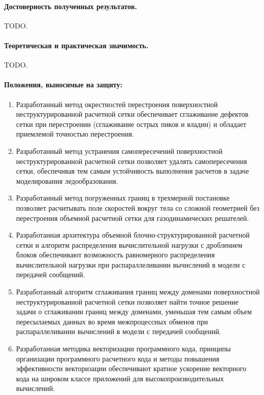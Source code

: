 \documentclass[a4paper,14pt]{extarticle}                     %
\theoremstyle{plain}                                         %
\begin{document}
\paragraph{Достоверность полученных результатов.} TODO.

\paragraph{Теоретическая и практическая значимость.} TODO.

\paragraph{Положения, выносимые на защиту:}
\begin{enumerate}
\item Разработанный метод окрестностей перестроения поверхностной неструктурированной расчетной сетки обеспечивает сглаживание дефектов сетки при перестроении (сглаживание острых пиков и владин) и обладает приемлемой точностью перестроения.
\item Разработанный метод устранения самопересечений поверхностной неструктурированной расчетной сетки позволяет удалять самопересечения сетки, обеспечивая тем самым устойчивость выполнения расчетов в задаче моделирования ледообразования.
\item Разработанный метод погруженных границ в трехмерной постановке позволяет расчитывать поле скоростей вокруг тела со сложной геометрией без перестроения объемной расчетной сетки для газодинамических решателей.
\item Разработанная архитектура объемной блочно-структурированной расчетной сетки и алгоритм распределения вычислительной нагрузки с дроблением блоков обеспечивают возможность равномерного распределения вычислительной нагрузки при распараллеливании вычислений в модели с передачей сообщений.
\item Разработанный алгоритм сглаживания границ между доменами поверхностной неструктурированной расчетной сетки позволяет найти точное решение задачи о сглаживании границ между доменами, уменьшая тем самым объем пересылаемых данных во время межпроцессных обменов при распараллеливании вычислений в модели с передачей сообщений.
\item Разработанная методика векторизации программного кода, принципы организации программного расчетного кода и методы повышения эффективности векторизации обеспечивают кратное ускорение векторного кода на широком классе приложений для высокопроизводительных вычислений.
\end{enumerate}
\end{document}
